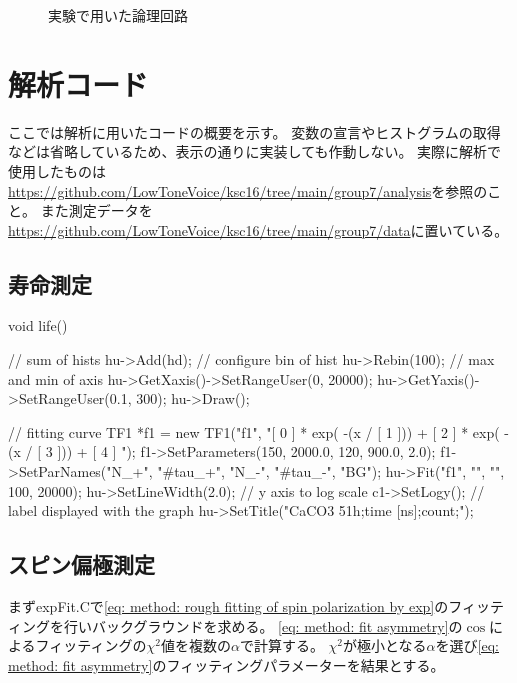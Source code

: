 \documentclass[dvipdfmx]{jsarticle}
\begin{document}
\begin{landscape}
    \begin{figure}
        \centering
        
        \caption{実験で用いた論理回路}
        \label{fig: full circuit}
    \end{figure}
\end{landscape}


\section{解析コード}

ここでは解析に用いたコードの概要を示す。
変数の宣言やヒストグラムの取得などは省略しているため、表示の通りに実装しても作動しない。
実際に解析で使用したものは\url{https://github.com/LowToneVoice/ksc16/tree/main/group7/analysis}を参照のこと。
また測定データを\url{https://github.com/LowToneVoice/ksc16/tree/main/group7/data}に置いている。

\subsection{寿命測定}

\begin{mylisting}[language=c++, caption=life.C]
void life()
{
    // sum of hists
    hu->Add(hd);
    // configure bin of hist
    hu->Rebin(100);
    // max and min of axis
    hu->GetXaxis()->SetRangeUser(0, 20000);
    hu->GetYaxis()->SetRangeUser(0.1, 300);
    hu->Draw();

    // fitting curve
    TF1 *f1 = new TF1("f1", "[ 0 ] * exp( -(x / [ 1 ])) + [ 2 ] * exp( -(x / [ 3 ])) +  [ 4 ] ");
    f1->SetParameters(150, 2000.0, 120, 900.0, 2.0);
    f1->SetParNames("N_{+}", "#tau_{+}", "N_{-}", "#tau_{-}", "BG");
    hu->Fit("f1", "", "", 100, 20000);
    hu->SetLineWidth(2.0);
    // y axis to log scale
    c1->SetLogy();
    // label displayed with the graph
    hu->SetTitle("CaCO3 51h;time [ns];count;");
}
\end{mylisting}

\subsection{スピン偏極測定}
まずexpFit.Cで\eqref{eq: method: rough fitting of spin polarization by exp}のフィッティングを行いバックグラウンドを求める。
\eqref{eq: method: fit asymmetry}の$\cos$によるフィッティングの$\chi^2$値を複数の$\alpha$で計算する。
$\chi^2$が極小となる$\alpha$を選び\eqref{eq: method: fit asymmetry}のフィッティングパラメーターを結果とする。
\end{document}
